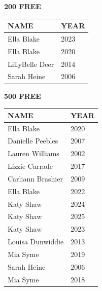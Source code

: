 \begin{table}[H]
\centering
\begin{minipage}[t]{0.48\textwidth}
\centering
\textbf{200 FREE}\\[0.1cm]
\begin{tabular}{@{}p{2.8cm}p{1.2cm}@{}}
\hline
    \textbf{NAME} & \textbf{YEAR} \\
\hline
    Ella Blake & 2023 \\
    Ella Blake & 2020 \\
    LillyBelle Deer & 2014 \\
    Sarah Heine & 2006 \\
\hline
\end{tabular}
\end{minipage}\hfill
\begin{minipage}[t]{0.48\textwidth}
\centering
\textbf{500 FREE}\\[0.1cm]
\begin{tabular}{@{}p{2.8cm}p{1.2cm}@{}}
\hline
    \textbf{NAME} & \textbf{YEAR} \\
\hline
    Ella Blake & 2020 \\
    Danielle Peebles & 2007 \\
    Lauren Williams & 2002 \\
    Lizzie Carrade & 2017 \\
    Carliann Brashier & 2009 \\
    Ella Blake & 2022 \\
    Katy Shaw & 2024 \\
    Katy Shaw & 2025 \\
    Katy Shaw & 2023 \\
    Louisa Dunwiddie & 2013 \\
    Mia Syme & 2019 \\
    Sarah Heine & 2006 \\
    Mia Syme & 2018 \\
\hline
\end{tabular}
\end{minipage}
\end{table}


